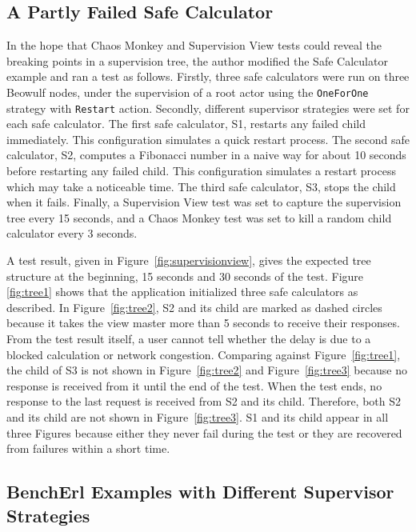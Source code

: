 \subsection{A Partly Failed Safe Calculator}
\label{calculator_chaos_test}

In the hope that Chaos Monkey and Supervision View tests could reveal 
the breaking points in a supervision tree, the author modified the Safe 
Calculator example and ran a test as follows.  Firstly, three 
safe calculators were run on three Beowulf nodes, under the supervision of a 
root actor using the {\tt OneForOne} strategy with {\tt Restart} action.  
Secondly, different supervisor strategies were set for each safe calculator.  
The first safe calculator, S1, restarts any failed child immediately.  This 
configuration simulates a quick restart process. The second safe calculator, 
S2, computes a Fibonacci number in a naive way for about 10 seconds before 
restarting any failed child.  This configuration simulates 
a restart process which may take a noticeable time.  The third safe calculator, 
S3, stops the child when it fails.  Finally, a Supervision View test was set to 
capture the supervision tree every 15 seconds, and a Chaos Monkey 
test was set to kill a random child calculator every 3 seconds.

A test result, given in Figure~\ref{fig:supervisionview}, gives the expected
tree structure at the beginning, 15 seconds and 30 seconds of the test.  Figure 
\ref{fig:tree1} shows that the application initialized three safe calculators 
as described.  In Figure~\ref{fig:tree2}, S2 and its child are marked as dashed 
circles because it takes the view master more than 5 seconds to receive their 
responses.  From the test result itself, a user cannot tell whether the delay 
is due to a blocked calculation or network congestion.  Comparing against 
Figure~\ref{fig:tree1}, the child of S3 is not shown in Figure~\ref{fig:tree2} 
and Figure~\ref{fig:tree3} because no response is received from it until the 
end of the test.  When the test ends, no response to the last request is 
received from S2 and its child.  Therefore, both S2 and its child are not shown 
in Figure~\ref{fig:tree3}.  S1 and its child appear in all three Figures 
because either they never fail during the test or they are recovered from 
failures within a short time.




\subsection{BenchErl Examples with Different Supervisor Strategies}
\label{bencherl_chaos_test}

